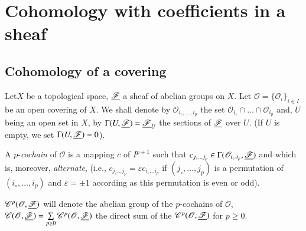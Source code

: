 \chapter{Cohomology with coefficients in a sheaf}\label{chap13}

\section{Cohomology of a covering}\label{chap13:sec1}

Let\pageoriginale $X$ be a topological space, $\underline{\mathscr{F}}$ a
sheaf of abelian groups on $X$. Let $\mathscr{O} =
\{\mathscr{O}_i\}_{i\in I}$ be an open covering of $X$. We shall
denote by $\mathscr{O}_{i_\circ, \ldots, i_p}$ the set
$\mathscr{O}_{i_\circ} \cap \ldots \cap \mathscr{O}_{i_p}$ and, $U$
being an open set in $X$, by $\Gamma(U, \underline{\mathscr{F}}) =
\underline{\mathscr{F}}_U$ the sections of $\underline{\mathscr{F}}$ over $U$. (If $U$
is empty, we set $\Gamma (U, \underline{\mathscr{F}}) = 0$).

\begin{defi*}
A $p$-\textit{cochain} of $\mathscr{O}$ is a mapping $c$ of $I^{p+1}$
such that $c_{j_\circ \ldots j_p} \in \Gamma (\mathscr{O}_{i_\circ
  \cdot i_p}, \underline{\mathscr{F}})$ and which is, moreover,
\textit{alternate}, (i.e., $c_{j_\circ \ldots j_p} = \varepsilon
c_{i_\circ \ldots i_p}$ if $(j_\circ, \ldots, j_p)$ is a permutation
of $(i_\circ, \ldots, i_p)$ and $\varepsilon = \pm 1$ according as
this permutation is even or odd). 
\end{defi*}

$\mathscr{C}^p (\mathscr{O}, \underline{\mathscr{F}})$ will denote the abelian
group of the $p$-cochains of $\mathscr{O}$, $\mathscr{C} (\mathscr{O},
\underline{\mathscr{F}}) = \sum\limits_{ p \geq 0} \mathscr{C}^p(\mathscr{O},
\underline{\mathscr{F}})$ the direct sum of the $\mathscr{C}^p (\mathscr{O},
\underline{\mathscr{F}})$ for $p \geq 0$. 

